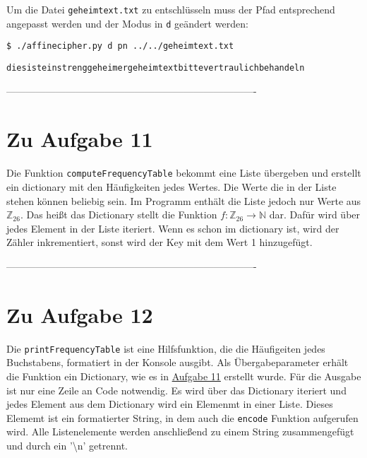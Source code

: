 \documentclass[12pt]{article}
\begin{document}
Um die Datei \texttt{geheimtext.txt} zu entschlüsseln muss der Pfad entsprechend angepasst werden und der Modus in \texttt{d} geändert werden:

\begin{lstlisting}
$ ./affinecipher.py d pn ../../geheimtext.txt
\end{lstlisting}

\begin{lstlisting}
diesisteinstrenggeheimergeheimtextbittevertraulichbehandeln
\end{lstlisting}


%
 ----------------------------------------------------------------------------
\section{Zu Aufgabe 11}
\label{sec:aufgabe_11}

Die Funktion \texttt{computeFrequencyTable} bekommt eine Liste übergeben und erstellt ein dictionary mit den Häufigkeiten jedes Wertes. Die Werte die in der Liste stehen können beliebig sein. Im Programm enthält die Liste jedoch nur Werte aus $\mathbb{Z}_{26}$. Das heißt das Dictionary stellt die Funktion $f: \mathbb{Z}_{26} \to \mathbb{N}$ dar. Dafür wird über jedes Element in der Liste iteriert. Wenn es schon im dictionary ist, wird der Zähler inkrementiert, sonst wird der Key mit dem Wert 1 hinzugefügt.


%
 ----------------------------------------------------------------------------
\section{Zu Aufgabe 12}

Die \texttt{printFrequencyTable} ist eine Hilfsfunktion, die die Häufigeiten jedes Buchstabens, formatiert in der Konsole ausgibt. Als Übergabeparameter erhält die Funktion ein Dictionary, wie es in \hyperref[sec:aufgabe_11]{Aufgabe 11} erstellt wurde. Für die Ausgabe ist nur eine Zeile an Code notwendig. Es wird über das Dictionary iteriert und jedes Element aus dem Dictionary wird ein Elemenmt in einer Liste. Dieses Elememt ist ein formatierter String, in dem auch die \texttt{encode} Funktion aufgerufen wird. Alle Listenelemente werden anschließend zu einem String zusammengefügt und durch ein '\textbackslash n' getrennt.
\end{document}
